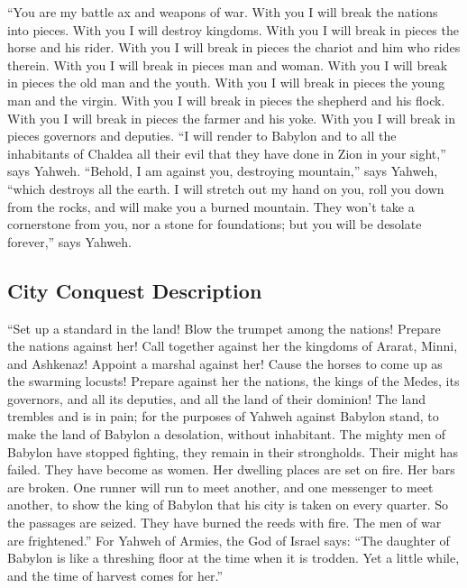  ``You are my battle ax and weapons of war. With you I
will break the nations into pieces. With you I will destroy kingdoms.
 With you I will break in pieces the horse and his rider.
 With you I will break in pieces the chariot and him who
rides therein. With you I will break in pieces man and woman. With you I
will break in pieces the old man and the youth. With you I will break in
pieces the young man and the virgin.  With you I will
break in pieces the shepherd and his flock. With you I will break in
pieces the farmer and his yoke. With you I will break in pieces
governors and deputies.  ``I will render to Babylon and
to all the inhabitants of Chaldea all their evil that they have done in
Zion in your sight,'' says Yahweh.  ``Behold, I am
against you, destroying mountain,'' says Yahweh, ``which destroys all
the earth. I will stretch out my hand on you, roll you down from the
rocks, and will make you a burned mountain.  They won't
take a cornerstone from you, nor a stone for foundations; but you will
be desolate forever,'' says Yahweh.

\hypertarget{city-conquest-description}{%
\subsection{City Conquest Description}\label{city-conquest-description}}

 ``Set up a standard in the land! Blow the trumpet among
the nations! Prepare the nations against her! Call together against her
the kingdoms of Ararat, Minni, and Ashkenaz! Appoint a marshal against
her! Cause the horses to come up as the swarming locusts!
 Prepare against her the nations, the kings of the Medes,
its governors, and all its deputies, and all the land of their dominion!
 The land trembles and is in pain; for the purposes of
Yahweh against Babylon stand, to make the land of Babylon a desolation,
without inhabitant.  The mighty men of Babylon have
stopped fighting, they remain in their strongholds. Their might has
failed. They have become as women. Her dwelling places are set on fire.
Her bars are broken.  One runner will run to meet
another, and one messenger to meet another, to show the king of Babylon
that his city is taken on every quarter.  So the passages
are seized. They have burned the reeds with fire. The men of war are
frightened.''  For Yahweh of Armies, the God of Israel
says: ``The daughter of Babylon is like a threshing floor at the time
when it is trodden. Yet a little while, and the time of harvest comes
for her.''

